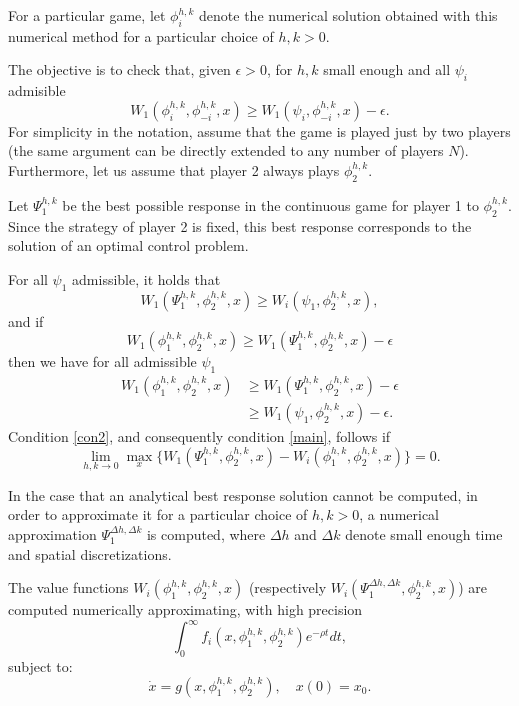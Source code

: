 \documentclass[12pt]{article}
\begin{document}
For a particular game, let $\phi^{h,k}_{i}$ denote the numerical solution obtained with this numerical method for a particular choice of $h,k>0$.

The objective is to check that, given $\epsilon>0$, for $h,k$ small enough and all $\psi_i$ admisible
\begin{equation}\label{main}
W_1(\phi_i^{h,k},\phi_{-i}^{h,k},x)\ge W_1(\psi_i,\phi_{-i}^{h,k},x)-\epsilon.
\end{equation}
For simplicity in the notation, assume that the game is played just by two players (the same argument can be directly extended to any number of players $N$). Furthermore, let us assume that player 2 always plays $\phi_{2}^{h,k}$.

Let $\Psi_1^{h,k}$ be the {best possible response} in the continuous game for player 1 to $\phi_{2}^{h,k}$. Since the strategy of player 2 is fixed, this best response corresponds to the solution of an optimal control problem.

For all $\psi_1$ admissible, it holds that
 $$W_1(\Psi_1^{h,k},\phi_{2}^{h,k},x)\ge W_i(\psi_1,\phi_{2}^{h,k},x),$$
and if
\begin{equation}\label{con2}
W_1(\phi_1^{h,k},\phi_{2}^{h,k},x)\ge W_1(\Psi_1^{h,k},\phi_{2}^{h,k},x)-\epsilon
\end{equation}
then we have for all admissible $\psi_1$
\begin{equation*}
\begin{split}
W_1(\phi_1^{h,k},\phi_2^{h,k},x)&\ge W_1(\Psi_1^{h,k},\phi_{2}^{h,k},x)-\epsilon\\
&\ge W_1(\psi_1,\phi_{2}^{h,k},x)-\epsilon.
\end{split}
\end{equation*}
Condition \eqref{con2}, and consequently condition \eqref{main}, follows if
\begin{equation}\label{equivcon2}
\lim_{h,k\rightarrow0}\max_{x}\bigl\{W_1(\Psi_1^{h,k},\phi_{2}^{h,k},x)-W_i(\phi_1^{h,k},\phi_2^{h,k},x)\bigr\}=0.
\end{equation}

In the case that an analytical best response solution cannot be computed, in order to approximate it for a particular choice of $h,k>0$, a numerical approximation $\Psi_1^{\Delta h,\Delta k}$ is computed, where $\Delta h$ and $\Delta k$ denote small enough time and spatial discretizations.

The value functions $W_i(\phi_1^{h,k},\phi_2^{h,k},x)$ (respectively $W_i(\Psi_1^{\Delta h,\Delta k},\phi_2^{h,k},x)$) are computed numerically approximating, with high precision
\begin{equation*}
\int_0^\infty f_i(x,\phi_1^{h,k},\phi_2^{h,k})e^{-\rho t} dt,
\end{equation*}
subject to:
\begin{equation*}
\dot{x}=g(x,\phi_1^{h,k},\phi_2^{h,k}),\quad x(0)=x_0.
\end{equation*}
\end{document}
